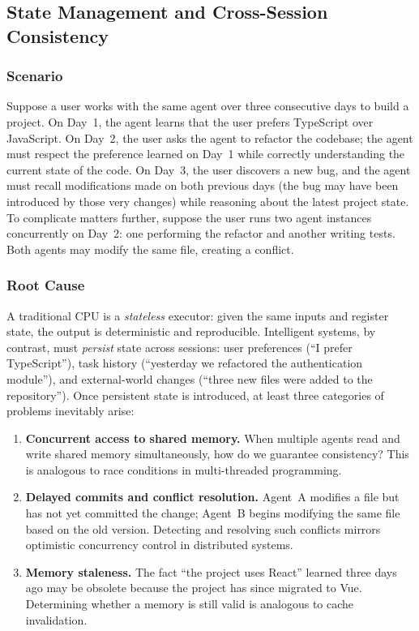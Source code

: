 \subsection{State Management and Cross-Session Consistency}

\subsubsection{Scenario}
Suppose a user works with the same agent over three consecutive days to build a project.
On Day~1, the agent learns that the user prefers TypeScript over JavaScript.
On Day~2, the user asks the agent to refactor the codebase; the agent must respect the preference learned on Day~1 while correctly understanding the current state of the code.
On Day~3, the user discovers a new bug, and the agent must recall modifications made on both previous days (the bug may have been introduced by those very changes) while reasoning about the latest project state.
To complicate matters further, suppose the user runs two agent instances concurrently on Day~2: one performing the refactor and another writing tests.
Both agents may modify the same file, creating a conflict.

\subsubsection{Root Cause}
A traditional CPU is a \emph{stateless} executor: given the same inputs and register state, the output is deterministic and reproducible.
Intelligent systems, by contrast, must \emph{persist} state across sessions: user preferences (``I prefer TypeScript''), task history (``yesterday we refactored the authentication module''), and external-world changes (``three new files were added to the repository'').
Once persistent state is introduced, at least three categories of problems inevitably arise:

\begin{enumerate}[nosep]
\item \textbf{Concurrent access to shared memory.}
When multiple agents read and write shared memory simultaneously, how do we guarantee consistency?
This is analogous to race conditions in multi-threaded programming.

\item \textbf{Delayed commits and conflict resolution.}
Agent~A modifies a file but has not yet committed the change; Agent~B begins modifying the same file based on the old version.
Detecting and resolving such conflicts mirrors optimistic concurrency control in distributed systems.

\item \textbf{Memory staleness.}
The fact ``the project uses React'' learned three days ago may be obsolete because the project has since migrated to Vue.
Determining whether a memory is still valid is analogous to cache invalidation.
\end{enumerate}

